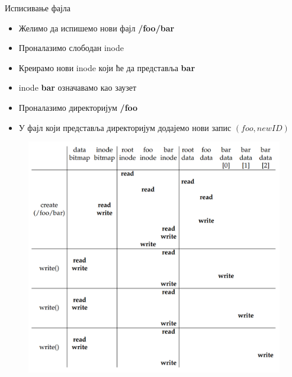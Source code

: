 \documentclass[xcolor=table]{beamer}
\begin{document}
    \begin{frame}[allowframebreaks]{Исписивање фајла}
        \begin{itemize}
            \item Желимо да испишемо нови фајл \textbf{/foo/bar}
            \item Проналазимо слободан inode
            \item Креирамо нови inode који ће да представља \textbf{bar}
            \item inode \textbf{bar} означавамо као заузет
            \item Проналазимо директоријум \textbf{/foo}
            \item У фајл који представља директоријум додајемо нови запис \begin{math}(foo, new ID)\end{math}
        \end{itemize}
        
        \framebreak
        
        \begin{figure}
            \centering
            \includegraphics[width=\textwidth,height=0.8\textheight,keepaspectratio]{images/write.png}
            \label{fig:write.png}
        \end{figure}
    \end{frame}
    
\end{document}
